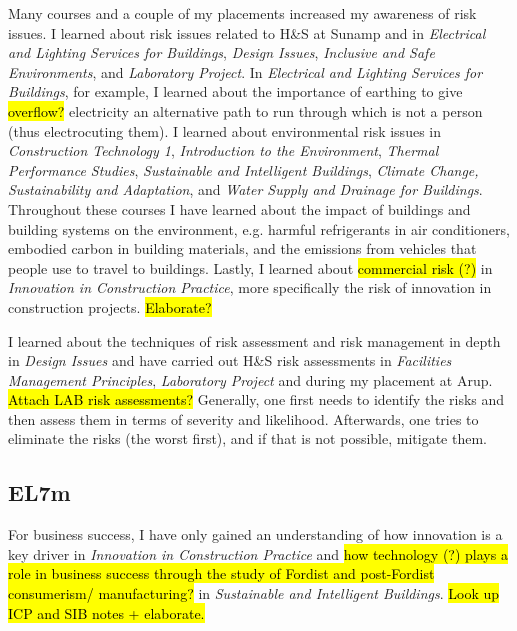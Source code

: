 Many courses and a couple of my placements increased my awareness of risk issues.
I learned about risk issues related to H\&S at Sunamp and in
\textit{Electrical and Lighting Services for Buildings},
\textit{Design Issues},
\textit{Inclusive and Safe Environments},
and
\textit{Laboratory Project}.
In \textit{Electrical and Lighting Services for Buildings}, for example, I learned about the importance of earthing to give \hl{overflow?} electricity an alternative path to run through which is not a person (thus electrocuting them).
I learned about environmental risk issues in
\textit{Construction Technology 1},
\textit{Introduction to the Environment},
\textit{Thermal Performance Studies},
\textit{Sustainable and Intelligent Buildings},
\textit{Climate Change, Sustainability and Adaptation},
and
\textit{Water Supply and Drainage for Buildings}.
Throughout these courses I have learned about the impact of buildings and building systems on the environment, e.g. harmful refrigerants in air conditioners, embodied carbon in building materials, and the emissions from vehicles that people use to travel to buildings.
Lastly, I learned about \hl{commercial risk (?)} in \textit{Innovation in Construction Practice}, more specifically the risk of innovation in construction projects.
\hl{Elaborate?}

I learned about the techniques of risk assessment and risk management in depth in \textit{Design Issues} and have carried out H\&S risk assessments in \textit{Facilities Management Principles}, \textit{Laboratory Project} and during my placement at Arup.
\hl{Attach LAB risk assessments?}
Generally, one first needs to identify the risks and then assess them in terms of severity and likelihood.
Afterwards, one tries to eliminate the risks (the worst first), and if that is not possible, mitigate them.


\subsection*{EL7m}

For business success, I have only gained an understanding of how innovation is a key driver in \textit{Innovation in Construction Practice} and \hl{how technology (?) plays a role in business success through the study of Fordist and post-Fordist consumerism/ manufacturing?} in \textit{Sustainable and Intelligent Buildings}.
\hl{Look up ICP and SIB notes + elaborate.}

